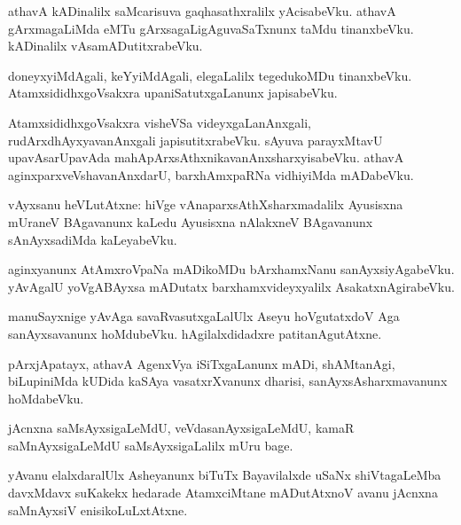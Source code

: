 \documentclass{article}
\begin{document}
\begin{mn}
athavA kADinalilx saMcarisuva gaqhasathxralilx yAcisabeVku. athavA gArxmagaLiMda eMTu 
gArxsagaLigAguvaSaTxnunx taMdu tinanxbeVku. kADinalilx vAsamADutitxrabeVku.
\end{mn}

\begin{mn}
doneyxyiMdAgali, keYyiMdAgali, elegaLalilx tegedukoMDu tinanxbeVku. AtamxsididhxgoVsakxra 
upaniSatutxgaLanunx japisabeVku.
\end{mn}

\begin{mn}
AtamxsididhxgoVsakxra visheVSa videyxgaLanAnxgali, rudArxdhAyxyavanAnxgali japisutitxrabeVku. sAyuva
parayxMtavU upavAsarUpavAda mahApArxsAthxnikavanAnxsharxyisabeVku. athavA 
aginxparxveVshavanAnxdarU, barxhAmxpaRNa vidhiyiMda mADabeVku.
\end{mn}


\begin{mn}
vAyxsanu heVLutAtxne: hiVge vAnaparxsAthXsharxmadalilx Ayusisxna mUraneV BAgavanunx kaLedu 
Ayusisxna nAlakxneV BAgavanunx sAnAyxsadiMda kaLeyabeVku.
\end{mn}

\begin{mn}
aginxyanunx AtAmxroVpaNa mADikoMDu bArxhamxNanu sanAyxsiyAgabeVku. yAvAgalU yoVgABAyxsa mADutatx 
barxhamxvideyxyalilx AsakatxnAgirabeVku.
\end{mn}

\begin{mn}
manuSayxnige yAvAga savaRvasutxgaLalUlx Aseyu hoVgutatxdoV Aga sanAyxsavanunx hoMdubeVku. 
hAgilalxdidadxre patitanAgutAtxne.
\end{mn}

\begin{mn}
pArxjApatayx, athavA AgenxVya iSiTxgaLanunx mADi, shAMtanAgi, biLupiniMda kUDida kaSAya 
vasatxrXvanunx dharisi, sanAyxsAsharxmavanunx hoMdabeVku.
\end{mn}

\begin{mn}
jAcnxna saMsAyxsigaLeMdU, veVdasanAyxsigaLeMdU, kamaR saMnAyxsigaLeMdU saMsAyxsigaLalilx mUru bage.
\end{mn}

\begin{mn}
yAvanu elalxdaralUlx Asheyanunx biTuTx Bayavilalxde uSaNx shiVtagaLeMba davxMdavx suKakekx 
hedarade AtamxciMtane mADutAtxnoV avanu jAcnxna saMnAyxsiV enisikoLuLxtAtxne.
\end{mn}
\end{document}
